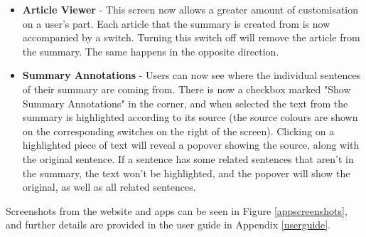 \documentclass[12pt]{article}
\begin{document}
\begin{itemize}
	\item \textbf{Article Viewer} - This screen now allows a greater amount of customisation on a user's part. Each article that the summary is created from is now accompanied by a switch. Turning this switch off will remove the article from the summary. The same happens in the opposite direction.
	\item \textbf{Summary Annotations} - Users can now see where the individual sentences of their summary are coming from. There is now a checkbox marked "Show Summary Annotations" in the corner, and when selected the text from the summary is highlighted according to its source (the source colours are shown on the corresponding switches on the right of the screen). Clicking on a highlighted piece of text will reveal a popover showing the source, along with the original sentence. If a sentence has some related sentences that aren't in the summary, the text won't be highlighted, and the popover will show the original, as well as all related sentences. \\
\end{itemize}

Screenshots from the website and apps can be seen in Figure \ref{appscreenshots}, and further details are provided in the user guide in Appendix \ref{userguide}.
\end{document}
